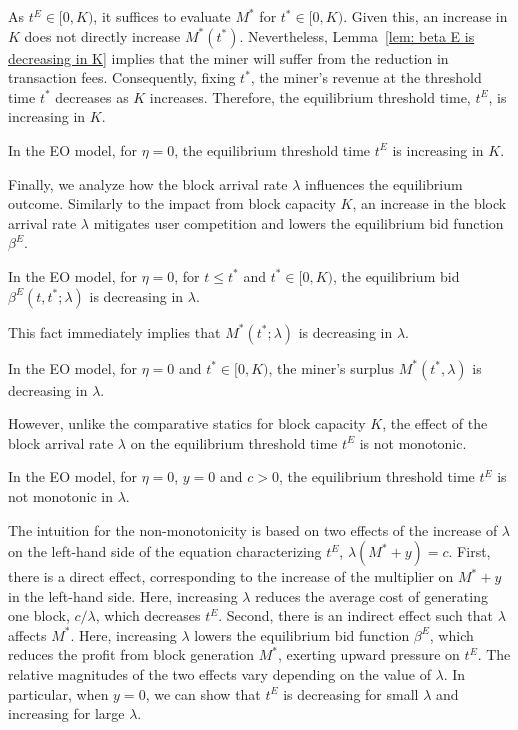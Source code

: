 \documentclass[12pt, letterpaper]{article}
\begin{document}
As $t^E \in [0, K)$, it suffices to evaluate $M^*$ for $t^* \in [0, K)$. Given this, an increase in $K$ does not directly increase $M^*(t^*)$. Nevertheless, Lemma~\ref{lem: beta E is decreasing in K} implies that the miner will suffer from the reduction in transaction fees. Consequently, fixing $t^*$, the miner's revenue at the threshold time $t^*$ decreases as $K$ increases. Therefore, the equilibrium threshold time, $t^E$, is increasing in $K$.


\begin{prop}\label{prop: tE is increasing in K}
    In the EO model, for $\eta = 0$, the equilibrium threshold time $t^E$ is increasing in $K$.
\end{prop}





Finally, we analyze how the block arrival rate $\lambda$ influences the equilibrium outcome. Similarly to the impact from block capacity $K$, an increase in the block arrival rate $\lambda$ mitigates user competition and lowers the equilibrium bid function $\beta^E$.

\begin{lem}\label{lem: beta is decreasing in lambda}
    In the EO model, for $\eta = 0$, for $t \le t^*$ and $t^* \in [0, K)$, the equilibrium bid $\beta^E(t, t^*; \lambda)$ is decreasing in $\lambda$.
\end{lem}



This fact immediately implies that $M^*(t^*; \lambda)$ is decreasing in $\lambda$.

\begin{lem}
    In the EO model, for $\eta= 0$ and $t^* \in [0, K)$, the miner's surplus $M^*(t^*, \lambda)$ is decreasing in $\lambda$.
\end{lem}

However, unlike the comparative statics for block capacity $K$, the effect of the block arrival rate $\lambda$ on the equilibrium threshold time $t^E$ is not monotonic. 

\begin{thm}\label{thm: tE is nonmonotonic in lambda}
    In the EO model, for $\eta = 0$, $y = 0$ and $c > 0$, the equilibrium threshold time $t^E$ is not monotonic in $\lambda$.
\end{thm}


The intuition for the non-monotonicity is based on two effects of the increase of $\lambda$ on the left-hand side of the equation characterizing $t^E$, $\lambda (M^*+ y) = c$.
First, there is a direct effect, corresponding to the increase of the multiplier on $M^*+y$ in the left-hand side. 
Here, increasing $\lambda$ reduces the average cost of generating one block, $c/\lambda$, which decreases $t^E$. 
Second, there is an indirect effect such that $\lambda$ affects $M^*$. Here, increasing $\lambda$ lowers the equilibrium bid function $\beta^E$, which reduces the profit from block generation $M^*$, exerting upward pressure on $t^E$.
The relative magnitudes of the two effects vary depending on the value of $\lambda$. In particular, when $y = 0$, we can show that $t^E$ is decreasing for small $\lambda$ and increasing for large $\lambda$. 
\end{document}
